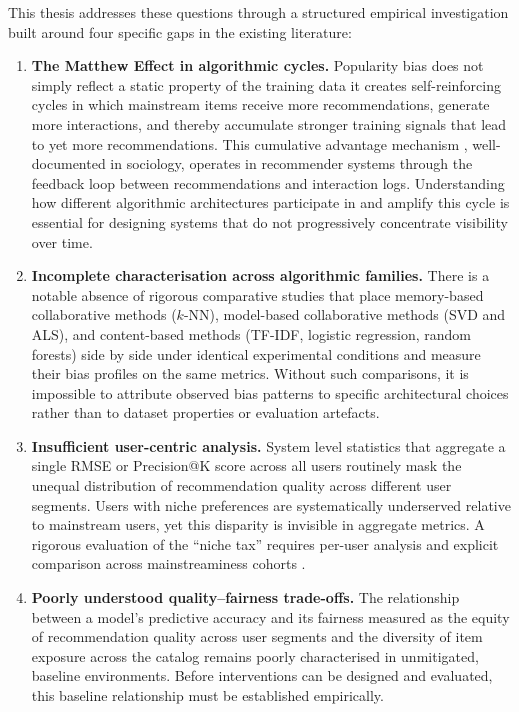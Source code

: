 \documentclass[11pt,a4paper]{report}
\begin{document}
This thesis addresses these questions through a structured empirical investigation built around four specific gaps in the existing literature:

\begin{enumerate}
    \item \textbf{The Matthew Effect in algorithmic cycles.} Popularity bias does not simply reflect a static property of the training data it creates self-reinforcing cycles in which mainstream items receive more recommendations, generate more interactions, and thereby accumulate stronger training signals that lead to yet more recommendations. This cumulative advantage mechanism \citep{merton1968social}, well-documented in sociology, operates in recommender systems through the feedback loop between recommendations and interaction logs. Understanding how different algorithmic architectures participate in and amplify this cycle is essential for designing systems that do not progressively concentrate visibility over time.

    \item \textbf{Incomplete characterisation across algorithmic families.} There is a notable absence of rigorous comparative studies that place memory-based collaborative methods ($k$-NN), model-based collaborative methods (SVD and ALS), and content-based methods (TF-IDF, logistic regression, random forests) side by side under identical experimental conditions and measure their bias profiles on the same metrics. Without such comparisons, it is impossible to attribute observed bias patterns to specific architectural choices rather than to dataset properties or evaluation artefacts.

    \item \textbf{Insufficient user-centric analysis.} System level statistics that aggregate a single RMSE or Precision@K score across all users routinely mask the unequal distribution of recommendation quality across different user segments. Users with niche preferences are systematically underserved relative to mainstream users, yet this disparity is invisible in aggregate metrics. A rigorous evaluation of the ``niche tax'' requires per-user analysis and explicit comparison across mainstreaminess cohorts \citep{abdollahpouri2021usercentered}.

    \item \textbf{Poorly understood quality--fairness trade-offs.} The relationship between a model's predictive accuracy and its fairness measured as the equity of recommendation quality across user segments and the diversity of item exposure across the catalog remains poorly characterised in unmitigated, baseline environments. Before interventions can be designed and evaluated, this baseline relationship must be established empirically.
\end{enumerate}
\end{document}
